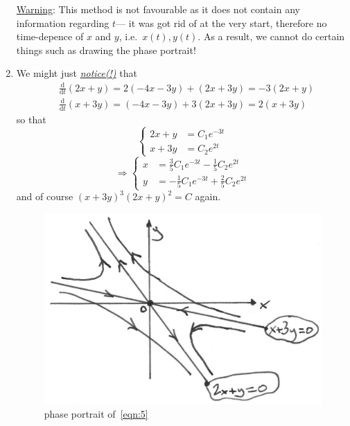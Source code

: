 \documentclass[12pt]{report}
\theoremstyle{definition}
\begin{document}
\begin{enumerate}[label = (\arabic*)]
\underline{Warning}: This method is not favourable as it does not contain any information regarding $t$--- 
it was got rid of at the very start, therefore no time-depence of $x$ and $y$, i.e.\ $x(t), y(t)$.
As a result, we cannot do certain things such as drawing the phase portrait!

\item We might just \emph{\underline{notice(!)}} that\[ %
    \begin{align*}
        & \frac{\mathrm{d}}{\mathrm{d}t} (2x + y) = 2(-4x - 3y) + (2x + 3y) = -3(2x + y) \\
        & \frac{\mathrm{d}}{\mathrm{d}t} (x + 3y) = (-4x - 3y) + 3(2x + 3y) = 2(x + 3y)
    \end{align*}
\]so that\[
    \left\{
        \begin{align*}
            2x + y & = C_1e^{-3t} \\
            x + 3y & = C_2e^{2t}
        \end{align*}
        \right.
\]\[
    \Rightarrow{}\left\{
        \begin{align*}
            x & = \frac{3}{5}C_1e^{-3t} - \frac{1}{5}C_2e^{2t} \\
            y & = -\frac{1}{5}C_1e^{-3t} + \frac{2}{5}C_2e^{2t}
        \end{align*}
        \right.
    \]and of course ${(x + 3y)}^{3}{(2x + y)}^{2} = C$ again.
    \begin{figure}
      	\includegraphics[scale=0.15]{2ndPhasePortrait.jpeg}
      	\centering
        \caption{phase portrait of~\eqref{eqn:5}}\label{fig:2ndPhaseP}
    \end{figure}
    


\end{enumerate}
\end{document}
